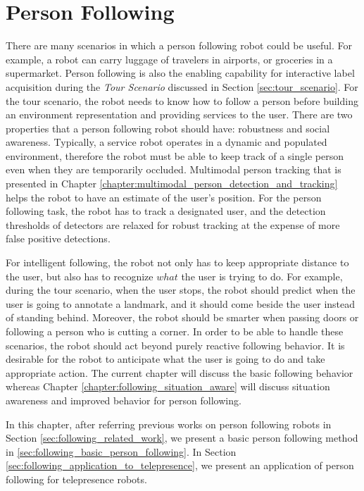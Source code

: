 
\chapter{Person Following}
\label{chapter:person_following}

There are many scenarios in which a person following robot could be useful. For example, a robot can carry luggage of travelers in airports, or groceries in a supermarket. Person following is also the enabling capability for interactive label acquisition during the \textit{Tour Scenario} discussed in Section \ref{sec:tour_scenario}. For the tour scenario, the robot needs to know how to follow a person before building an environment representation and providing services to the user.  There are two properties that a person following robot should have: robustness and social awareness. Typically, a service robot operates in a dynamic and populated environment, therefore the robot must be able to keep track of a single person even when they are temporarily occluded. Multimodal person tracking that is presented in Chapter \ref{chapter:multimodal_person_detection_and_tracking} helps the robot to have an estimate of the user's position. For the person following task, the robot has to track a designated user, and the detection thresholds of detectors are relaxed for robust tracking at the expense of more false positive detections. 

For intelligent following, the robot not only has to keep appropriate distance to the user, but also has to recognize $what$ the user is trying to do. For example, during the tour scenario, when the user stops, the robot should predict when the user is going to annotate a landmark, and it should come beside the user instead of standing behind. Moreover, the robot should be smarter when passing doors or following a person who is cutting a corner. In order to be able to handle these scenarios, the robot should act beyond purely reactive following behavior. It is desirable for the robot to anticipate what the user is going to do and take appropriate action. The current chapter will discuss the basic following behavior whereas Chapter \ref{chapter:following_situation_aware} will discuss situation awareness and improved behavior for person following.

In this chapter, after referring previous works on person following robots in Section \ref{sec:following_related_work}, we present a basic person following method in \ref{sec:following_basic_person_following}. In Section \ref{sec:following_application_to_telepresence}, we present an application of person following for telepresence robots.

